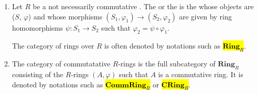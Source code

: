 \begin{definition} \label{definition:category_of_rings_over_a_ring}
    \begin{enumerate}
        \item Let $R$ be a not necessarily commutative . The  or the  is the   whose objects are  ($S$, $\varphi$) and whose morphisms $(S_1, \varphi_1) \to (S_2, \varphi_2)$ are given by ring homomorphisms $\psi: S_1 \to S_2$ such that $\varphi_2 = \psi \circ \varphi_1$.
        \begin{center}
        \end{center}
        The category of rings over $R$ is often denoted by notations such as \hl{$\mathbf{Ring}_R$}.

        \item The category of commutatative $R$-rings is the full subcategory of $\mathbf{Ring}_R$ consisting of the $R$-rings $(A, \varphi)$ such that $A$ is a commutative ring. It is denoted by notations such as \hl{$\mathbf{CommRing}_R$} or \hl{$\mathbf{CRing}_R$}. 
    \end{enumerate} 
\end{definition}